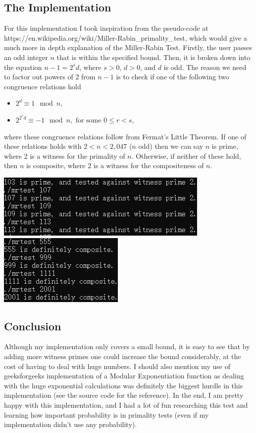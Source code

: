 \documentclass{article}
\begin{document}
\subsection{The Implementation}
For this implementation I took inspiration from the pseudo-code at 
https://en.wikipedia.org/wiki/Miller-Rabin\_primality\_test, 
which would give a much more in depth explanation of the Miller-Rabin Test. Firstly, the user passes
an odd integer $n$ that is within the specified bound. Then, it is broken down into the equation
$n-1 = 2^s d$, where $s > 0$, $d>0$, and $d$ is odd. The reason we need to factor out powers of 2 from $n-1$
is to check if one of the following two congruence relations hold
\begin{itemize}
\item $2^d \equiv1\!\mod{n},$
\item $2^{2^rd} \equiv-1\!\mod{n}, \text{ for some } 0 \leq r < s,$
\end{itemize}
where these congruence relations follow from Fermat's Little Theorem. If one of these relations holds with
$2 < n < 2,047$ ($n$ odd) then we can say $n$ is prime, where 2 is a witness for the primality of $n$. Otherwise, if
neither of these hold, then $n$ is composite, where $2$ is a witness for the compositeness of $n$.
\begin{center}
  \includegraphics[scale=0.9]{primes.PNG}
  \includegraphics[scale=0.818]{composites.PNG}
\end{center}
\subsection{Conclusion}
Although my implementation only covers a small bound, it is easy to see that by adding more witness primes one could
increase the bound considerably, at the cost of having to deal with huge numbers. I should also mention my use of
geeksforgeeks implementation of a Modular Exponentiation function as dealing with the huge exponential
calculations was definitely the biggest hurdle in this implementation (see the source code for the reference).
In the end, I am pretty happy with this implementation, and I had a lot of fun researching this test and learning
how important probability is in primality tests (even if my implementation didn't use any probability).
\end{document}
